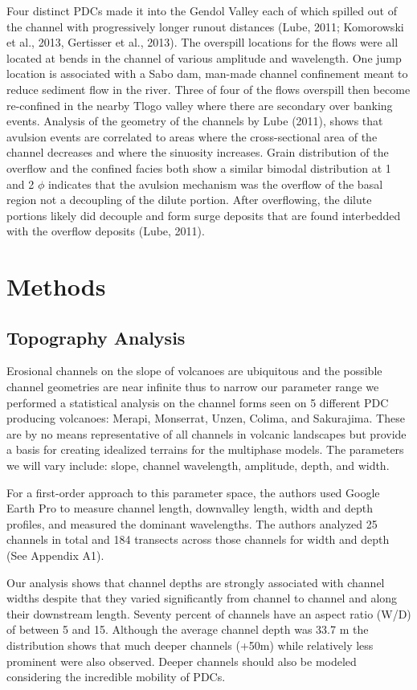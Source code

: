 Four distinct PDCs made it into the Gendol Valley each of which spilled out of the channel with progressively longer runout distances (Lube, 2011; Komorowski et al., 2013, Gertisser et al., 2013). The overspill locations for the flows were all located at bends in the channel of various amplitude and wavelength. One jump location is associated with a Sabo dam, man-made channel confinement meant to reduce sediment flow in the river. Three of four of the flows overspill then become re-confined in the nearby Tlogo valley where there are secondary over banking events.  Analysis of the geometry of the channels by Lube (2011), shows that avulsion events are correlated to areas where the cross-sectional area of the channel decreases and where the sinuosity increases. Grain distribution of the overflow and the confined facies both show a similar bimodal distribution at 1 and 2 \(\phi\) indicates that the avulsion mechanism was the overflow of the basal region not a decoupling of the dilute portion. After overflowing, the dilute portions likely did decouple and form surge deposits that are found interbedded with the overflow deposits (Lube, 2011). 
\section{Methods}
\label{sec:meth}
\subsection{Topography Analysis}
Erosional channels on the slope of volcanoes are ubiquitous and the possible channel geometries are near infinite thus to narrow our parameter range we performed a statistical analysis on the channel forms seen on 5 different PDC producing volcanoes: Merapi, Monserrat, Unzen, Colima, and Sakurajima. These are by no means representative of all channels in volcanic landscapes but provide a basis for creating idealized terrains for the multiphase models. The parameters we will vary include: slope, channel wavelength, amplitude, depth, and width. 

For a first-order approach to this parameter space, the authors used Google Earth Pro to measure channel length, downvalley length, width and depth profiles, and measured the dominant wavelengths. The authors analyzed 25 channels in total and 184 transects across those channels for width and depth (See Appendix A1). 

Our analysis shows that channel depths are strongly associated with channel widths despite that they varied significantly from channel to channel and along their downstream length. Seventy percent of channels have an aspect ratio (W/D) of between 5 and 15. Although the average channel depth was 33.7 m the distribution shows that much deeper channels (+50m) while relatively less prominent were also observed. Deeper channels should also be modeled considering the incredible mobility of PDCs. 

